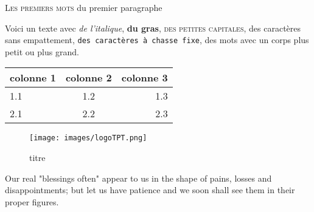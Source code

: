 \myTitle{}

\lettrine{L}{es premiers mots} du premier paragraphe 

Voici un texte avec
\emph{de l'italique},
\textbf{du gras},
\textsc{des petites capitales},
\textsf{des caractères sans empattement},
\texttt{des caractères à chasse fixe},
des mots avec {\small{un corps plus petit}} ou {\large{plus grand}}.

\begin{tabular}{|l|c|r|}
  \hline
  colonne 1 & colonne 2 & colonne 3 \\
  \hline
  1.1 & 1.2 & 1.3 \\
  2.1 & 2.2 & 2.3 \\
  \hline
\end{tabular}


\begin{figure}[h]
   \caption{\label{étiquette} titre}
    \texttt{[image: images/logoTPT.png]}
\end{figure}


  Our real "blessings often" appear to us in the shape of pains, losses and disappointments; but let us have patience and we soon shall see them in their proper figures.

